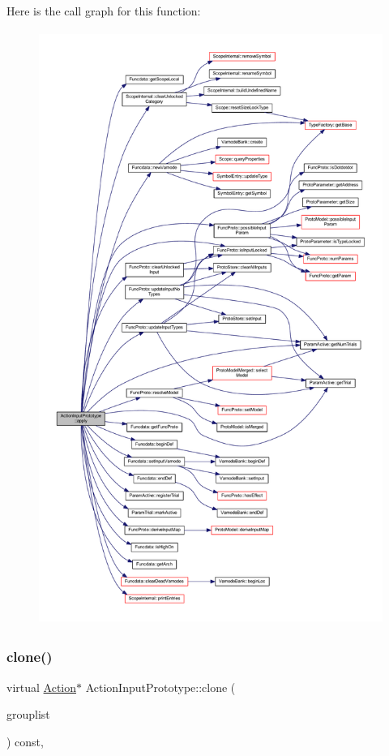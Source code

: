 Here is the call graph for this function\+:
\nopagebreak
\begin{figure}[H]
\begin{center}
\leavevmode
\includegraphics[height=550pt]{class_action_input_prototype_ace1078c436c86aba604abb99b82180ae_cgraph}
\end{center}
\end{figure}
\mbox{\label{class_action_input_prototype_a2443b3263f3b443bb7c99261a7f6289e}} 
\subsubsection{\texorpdfstring{clone()}{clone()}}
{\footnotesize\ttfamily virtual \mbox{\hyperlink{class_action}{Action}}$\ast$ Action\+Input\+Prototype\+::clone (\begin{DoxyParamCaption}\item[{const \mbox{\hyperlink{class_action_group_list}{Action\+Group\+List}} \&}]{grouplist }\end{DoxyParamCaption}) const\hspace{0.3cm}{\ttfamily [inline]}, {\ttfamily [virtual]}}



